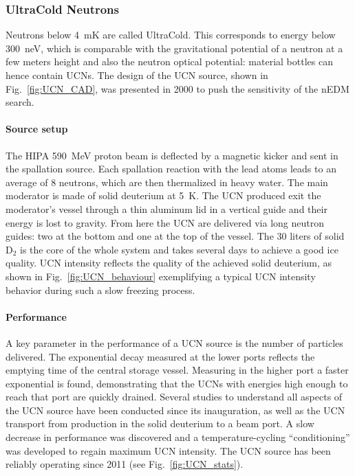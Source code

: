 \begin{refsection}
        \subsubsection{UltraCold Neutrons}
            Neutrons below \SI{4}{mK} are called UltraCold. 
            This corresponds to energy below \SI{300}{neV}, which is comparable with the gravitational potential of a neutron at a few meters height and also the neutron optical potential: material bottles can hence contain UCNs.        
            The design of the UCN source, shown in Fig.~\ref{fig:UCN_CAD}, was presented in 2000 to push the sensitivity of the nEDM search.
        
            \paragraph{Source setup}
            The HIPA \SI{590}{MeV} proton beam is deflected by a magnetic kicker and sent in the spallation source.
            Each spallation reaction with the lead atoms leads to an average of 8 neutrons, which are then thermalized in heavy water.
            The main moderator is made of solid deuterium at \SI{5}{K}.
            The UCN produced exit the moderator's vessel through a thin aluminum lid in a vertical guide and their energy is lost to gravity.
            From here the UCN are delivered via  long neutron guides: two at the bottom and one at the top of the vessel.
            The 30 liters of solid D$_2$ is the core of the whole system and takes several days to achieve a good ice quality.
            UCN intensity reflects the quality of the achieved solid deuterium, as shown in Fig.~\ref{fig:UCN_behaviour} exemplifying a typical UCN intensity behavior during such a slow freezing process.
        
            \paragraph{Performance}
            A key parameter in the performance of a UCN source is the number of particles delivered.
            The exponential decay measured at the lower ports reflects the emptying time of the central storage vessel.
            Measuring in the higher port a faster exponential is found, demonstrating that the UCNs with energies high enough to reach that port are quickly drained.
            Several studies to understand all aspects of the UCN source have been conducted since its inauguration, as well as the UCN transport from production in the solid deuterium to a beam port.
            A slow decrease in performance was discovered and a temperature-cycling ``conditioning'' was developed to regain maximum UCN intensity.
            The UCN source has been reliably operating since 2011 (see Fig.~\ref{fig:UCN_stats}).
    

\end{refsection}
